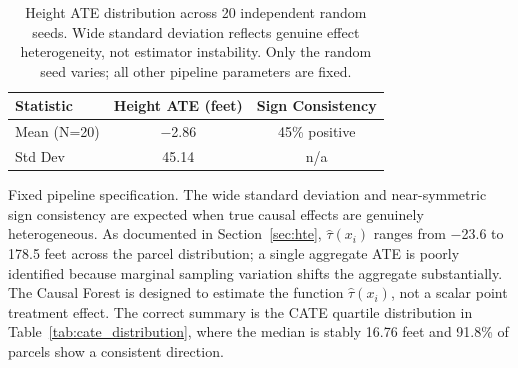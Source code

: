 \begin{table}[H]
\centering
\caption[Multi-Seed ATE Stability (N=20)]{Height ATE distribution across 20 independent random seeds. Wide standard deviation reflects genuine effect heterogeneity, not estimator instability. Only the random seed varies; all other pipeline parameters are fixed.}
\label{tab:seed_stability}
\begin{tabular}{lcc}
\toprule
\textbf{Statistic} & \textbf{Height ATE (feet)} & \textbf{Sign Consistency} \\
\midrule
Mean (N=20) & $-$2.86  & 45\% positive \\
Std Dev     & \phantom{$-$}45.14 & n/a \\
\bottomrule
\end{tabular}
\par\smallskip
\footnotesize Fixed pipeline specification. The wide standard deviation and near-symmetric sign consistency are expected when true causal effects are genuinely heterogeneous. As documented in Section~\ref{sec:hte}, $\hat{\tau}(x_i)$ ranges from $-$23.6 to 178.5 feet across the parcel distribution; a single aggregate ATE is poorly identified because marginal sampling variation shifts the aggregate substantially. The Causal Forest is designed to estimate the function $\hat{\tau}(x_i)$, not a scalar point treatment effect. The correct summary is the CATE quartile distribution in Table~\ref{tab:cate_distribution}, where the median is stably 16.76 feet and 91.8\% of parcels show a consistent direction.
\end{table}
